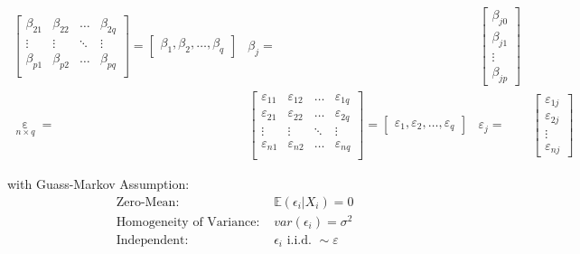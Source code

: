 \begin{subequations}
\begin{align}
\begin{bmatrix}
        \beta _{21}&\beta _{22}&\ldots&\beta _{2q}\\
        \vdots&\vdots&\ddots&\vdots\\
        \beta _{p1}&\beta _{p2}&\ldots&\beta _{pq}\\
        \end{bmatrix} =\begin{bmatrix}
            \beta _1,\beta _2,\ldots,\beta _q
        \end{bmatrix}
        & \beta _j=&\begin{bmatrix}
            \beta _{j0}\\
            \beta_{j1}\\
            \vdots\\
            \beta_{jp}
        \end{bmatrix}\\
        \mathop{\varepsilon }\limits_{n\times q} =&
        \begin{bmatrix}
        \varepsilon _{11}&\varepsilon _{12}&\ldots&\varepsilon _{1q}\\
        \varepsilon _{21}&\varepsilon _{22}&\ldots&\varepsilon _{2q}\\
        \vdots&\vdots&\ddots&\vdots\\
        \varepsilon _{n1}&\varepsilon _{n2}&\ldots&\varepsilon _{nq}\\
        \end{bmatrix}=
        \begin{bmatrix}
            \varepsilon _1,\varepsilon _2,\ldots,\varepsilon _q
        \end{bmatrix}
        &
        \varepsilon _j=&\begin{bmatrix}
                \varepsilon _{1j}\\
                \varepsilon _{2j}\\
                \vdots\\
                \varepsilon _{nj}
            \end{bmatrix}
    \end{align}
\end{subequations}

with Guass-Markov Assumption:\hypertarget{GaussMarkovAssumption}{}
\begin{equation}\label{EqaGaussMarkovAssumption}
    \begin{aligned}
        \text{Zero-Mean: }&\mathbb{E}(\epsilon_i|X_i)=0 \\
        \text{Homogeneity of Variance: }&var(\epsilon_i)=\sigma^2\\
        \text{Independent: }&\epsilon_i\text{ i.i.d. }\sim \varepsilon
    \end{aligned}
\end{equation}

